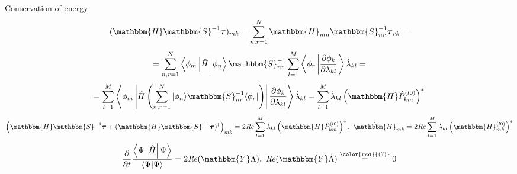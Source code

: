 \begin{frame}{}
\begin{block}{Conservation of energy:}
$$(\mathbbm{H}\mathbbm{S}^{-1}\boldsymbol{\tau})_{mk}=\sum_{n,r=1}^N\mathbbm{H}_{mn}\mathbbm{S}^{-1}_{nr}\boldsymbol{\tau}_{rk}=$$
$$=\sum_{n,r=1}^N\mymean{\phi_m}{\hat{H}}{\phi_n}\mathbbm{S}^{-1}_{nr}\sum_{l=1}^M\myelr{\phi_r}{\frac{\partial\phi_k}{\partial\lambda_{kl}}}\dot{\lambda}_{kl}=$$
$$=\sum_{l=1}^M\mymean{\phi_m}{\hat{H}\left(\sum_{n,r=1}^N|\phi_n\rangle\mathbbm{S}^{-1}_{nr}\langle\phi_r|\right)}{\frac{\partial\phi_k}{\partial\lambda_{kl}}}\dot{\lambda}_{kl}=%
   \sum_{l=1}^M\dot{\lambda}_{kl}\left(\mathbbm{H}\hat{P}_{km}^{(l0)}\right)^*$$
$$\left(\mathbbm{H}\mathbbm{S}^{-1}\boldsymbol{\tau}+(\mathbbm{H}\mathbbm{S}^{-1}\boldsymbol{\tau})^{\dagger}\right)_{mk}=%
   2\mathit{Re}\sum_{l=1}^M\dot{\lambda}_{kl}\left(\mathbbm{H}\hat{P}_{km}^{(l0)}\right)^*,\ %
\dot{\mathbbm{H}}_{mk}=2\mathit{Re}\sum_{l=1}^M\dot{\lambda}_{kl}\left(\mathbbm{H}_{mk}^{(l0)}\right)^*$$
$$\frac{\partial}{\partial t}\frac{\mymean{\Psi}{\hat{H}}{\Psi}}{\myel{\Psi}{\Psi}}=%
  2\mathit{Re}(\mathbbm{Y}\dot{\Lambda}),\ %
  \mathit{Re}(\mathbbm{Y}\dot{\Lambda})\overset{{\color{red}{(?)}}}{=}0$$
\end{block}
\end{frame}


